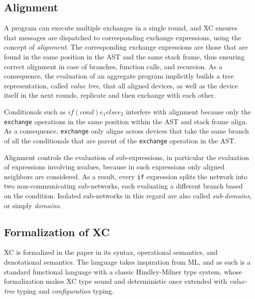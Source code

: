 

\subsection{Alignment}\label{chap:background->sec:xc->subsec:alignment}

A program can execute multiple exchanges in a single round, and \ac{XC} ensures that messages are dispatched to corresponding exchange expressions, using the concept of \textit{alignment}.
%
The corresponding exchange expressions are those that are found in the same position in the \ac{AST} and the same stack frame, thus ensuring correct alignment in case of branches, function calls, and recursion\cite{xc}.
%
As a consequence, the evaluation of an aggregate program implicitly builds a tree representation, called \textit{value tree}, that all aligned devices, as well as the device itself in the next rounds, replicate and then exchange with each other.

Conditionals such as $if (cond) {e_1} else {e_2}$ interfere with alignment because only the \texttt{exchange} operations in the same position within the AST and stack frame align\cite{xc}.
%
As a consequence, \texttt{exchange} only aligns across devices that take the same branch of all the conditionals that are parent of the \texttt{exchange} operation in the AST.

Alignment controls the evaluation of sub-expressions, in particular the evaluation of expressions involving nvalues, because in such expressions only aligned neighbors are considered.
%
As a result, every \texttt{if} expression splits the network into two non-communicating sub-networks, each evaluating a different branch based on the condition\cite{xc}.
%
Isolated sub-networks in this regard are also called \textit{sub-domains}, or simply \textit{domains}.

\subsection{Formalization of XC}

\ac{XC} is formalized in the paper\cite{xc} in its syntax, operational semantics, and denotational semantics.
%
The language takes inspiration from \ac{ML}, and as such is a standard functional language with a classic Hindley-Milner type system, whose formalization makes \ac{XC} type sound and deterministic once extended with \textit{value-tree} typing and \textit{configuration} typing\cite{xc}.

